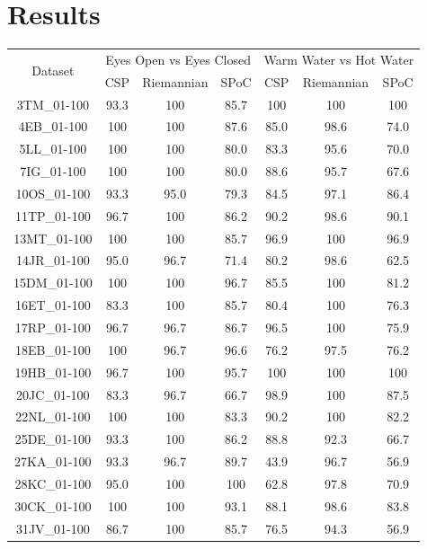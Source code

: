 \documentclass[11pt]{article}
\begin{document}
\section{Results}

\begin{center}
  \begin{tabular}{ccccccc}
    \hline
    \multirow{2}{*}{Dataset} &
      \multicolumn{3}{c}{Eyes Open vs Eyes Closed} &
      \multicolumn{3}{c}{Warm Water vs Hot Water} \\
    & CSP & Riemannian & SPoC & CSP & Riemannian & SPoC \\
    \hline
    3TM\_01-100 & 93.3 & 100 & 85.7 & 100 & 100 & 100 \\
    4EB\_01-100 & 100 & 100 & 87.6 & 85.0 & 98.6 & 74.0  \\
    5LL\_01-100 & 100 & 100 & 80.0 & 83.3 & 95.6 & 70.0 \\
    7IG\_01-100 & 100 & 100 & 80.0 & 88.6 & 95.7 & 67.6 \\
    10OS\_01-100 & 93.3 & 95.0 & 79.3 & 84.5 & 97.1 & 86.4 \\
    11TP\_01-100 & 96.7 & 100 & 86.2 & 90.2 & 98.6 & 90.1 \\
    13MT\_01-100 & 100 & 100 & 85.7 & 96.9 & 100 & 96.9 \\
    14JR\_01-100 & 95.0 & 96.7 & 71.4 & 80.2 & 98.6 & 62.5 \\
    15DM\_01-100 & 100 & 100 & 96.7 & 85.5 & 100 & 81.2 \\
    16ET\_01-100 & 83.3 & 100 & 85.7 & 80.4 & 100 & 76.3 \\
    17RP\_01-100 & 96.7 & 96.7 & 86.7 & 96.5 & 100 & 75.9 \\
    18EB\_01-100 & 100 & 96.7 & 96.6 & 76.2 & 97.5 & 76.2 \\ 
    19HB\_01-100 & 96.7 & 100 & 95.7 & 100 & 100 & 100 \\
    20JC\_01-100 & 83.3 & 96.7 & 66.7 & 98.9 & 100 & 87.5 \\
    22NL\_01-100 & 100 & 100 & 83.3 & 90.2 & 100 & 82.2 \\
    25DE\_01-100 & 93.3 & 100 & 86.2 & 88.8 & 92.3 & 66.7 \\
    27KA\_01-100 & 93.3 & 96.7 & 89.7 & 43.9 & 96.7 & 56.9 \\
    28KC\_01-100 & 95.0 & 100 & 100 & 62.8 & 97.8 & 70.9 \\
    30CK\_01-100 & 100 & 100 & 93.1 & 88.1 & 98.6 & 83.8 \\
    31JV\_01-100 & 86.7 & 100 & 85.7 & 76.5 & 94.3 & 56.9 \\

\end{tabular}
\end{center}
\end{document}
